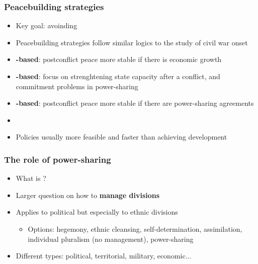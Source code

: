 \documentclass[aspectratio=43]{beamer}
\begin{document}



\begin{frame}
\frametitle{Peacebuilding strategies}
\centering

\begin{itemize}
  \item Key goal: avoinding 
  \item Peacebuilding strategies follow similar logics to the study of civil war onset
  \item<2->[1.] \textbf{{\color{red}{Greed}}-based}: postconflict peace more stable if there is economic growth
  \item<3->[2.] \textbf{{\color{red}{Opportunity}}-based}: focus on strenghtening state capacity after a conflict, and commitment problems in power-sharing
  \item<4->[3.] \textbf{{\color{red}{Grievance}}-based}: postconflict peace more stable if there are power-sharing agreements
  \item<4->[]
  \item<5-> Policies usually more feasible and faster than achieving development
\end{itemize}

\end{frame}

\begin{frame}
\frametitle{The role of power-sharing}
\centering

\begin{itemize}[<+->]
  \item What is ?
  \item Larger question on how to \textbf{manage divisions}
  \item Applies to political but especially to ethnic divisions
  \begin{itemize}
    \item Options: hegemony, ethnic cleansing, self-determination, assimilation, individual pluralism (no management), power-sharing
  \end{itemize}
  \item Different types: political, territorial, military, economic...
\end{itemize}

\end{frame}
\end{document}
